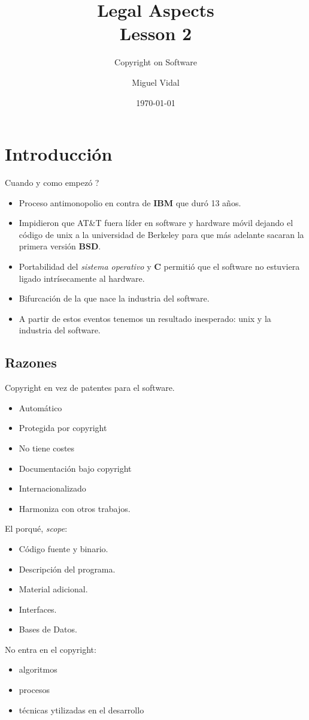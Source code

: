 \documentclass[11pt]{scrartcl}
\title{\textbf{Legal Aspects\\
				Lesson 2}}
\subtitle{Copyright on Software}
\author{Miguel Vidal}
\date{\today}
\begin{document}
\maketitle

\section{Introducci\'on}

Cuando y como empez\'o ?
\begin{itemize}
	\item Proceso antimonopolio en contra de \textbf{IBM} que dur\'o 13 a\~nos.
	\item Impidieron que AT\&T fuera l\'ider en software y hardware m\'ovil dejando el c\'odigo de unix a la universidad de Berkeley para que m\'as adelante sacaran la primera versi\'on \textbf{BSD}.
	\item Portabilidad del \emph{sistema operativo} y \textbf{C} permiti\'o que el software no estuviera ligado intr\'isecamente al hardware.
	\item Bifurcaci\'on de la que nace la industria del software.
	\item A partir de estos eventos tenemos un resultado inesperado: unix y la industria del software.
\end{itemize}

\subsection{Razones}

Copyright en vez de patentes para el software.
\begin{itemize}
	\item Autom\'atico
	\item Protegida por copyright
	\item No tiene costes
	\item Documentaci\'on bajo copyright
	\item Internacionalizado
	\item Harmoniza con otros trabajos.
\end{itemize}
El porqu\'e, \emph{scope}:
\begin{itemize}
	\item C\'odigo fuente y binario.
	\item Descripci\'on del programa.
	\item Material adicional.
	\item Interfaces.
	\item Bases de Datos.
\end{itemize}
No entra en el copyright:
\begin{itemize}
	\item algoritmos
	\item procesos
	\item t\'ecnicas ytilizadas en el desarrollo
\end{itemize}
\end{document}
